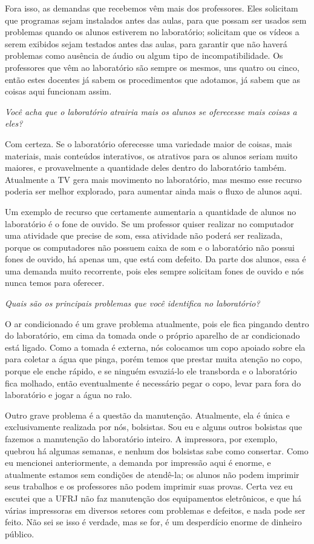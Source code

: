 Fora isso, as demandas que recebemos vêm mais dos professores. Eles solicitam que programas sejam instalados antes das aulas, para que possam ser usados sem problemas quando os alunos estiverem no laboratório; solicitam que os vídeos a serem exibidos sejam testados antes das aulas, para garantir que não haverá problemas como ausência de áudio ou algum tipo de incompatibilidade. Os professores que vêm ao laboratório são sempre os mesmos, uns quatro ou cinco, então estes docentes já sabem os procedimentos que adotamos, já sabem que as coisas aqui funcionam assim.

\textit{Você acha que o laboratório atrairia mais os alunos se oferecesse mais coisas a eles?}

Com certeza. Se o laboratório oferecesse uma variedade maior de coisas, mais materiais, mais conteúdos interativos, os atrativos para os alunos seriam muito maiores, e provavelmente a quantidade deles dentro do laboratório também. Atualmente a TV gera mais movimento no laboratório, mas mesmo esse recurso poderia ser melhor explorado, para aumentar ainda mais o fluxo de alunos aqui.

Um exemplo de recurso que certamente aumentaria a quantidade de alunos no laboratório é o fone de ouvido. Se um professor quiser realizar no computador uma atividade que precise de som, essa atividade não poderá ser realizada, porque os computadores não possuem caixa de som e o laboratório não possui fones de ouvido, há apenas um, que está com defeito. Da parte dos alunos, essa é uma demanda muito recorrente, pois eles sempre solicitam fones de ouvido e nós nunca temos para oferecer.

\textit{Quais são os principais problemas que você identifica no laboratório?}

O ar condicionado é um grave problema atualmente, pois ele fica pingando dentro do laboratório, em cima da tomada onde o próprio aparelho de ar condicionado está ligado. Como a tomada é externa, nós colocamos um copo apoiado sobre ela para coletar a água que pinga, porém temos que prestar muita atenção no copo, porque ele enche rápido, e se ninguém esvaziá-lo ele transborda e o laboratório fica molhado, então eventualmente é necessário pegar o copo, levar para fora do laboratório e jogar a água no ralo.

Outro grave problema é a questão da manutenção. Atualmente, ela é única e exclusivamente realizada por nós, bolsistas. Sou eu e alguns outros bolsistas que fazemos a manutenção do laboratório inteiro. A impressora, por exemplo, quebrou há algumas semanas, e nenhum dos bolsistas sabe como consertar. Como eu mencionei anteriormente, a demanda por impressão aqui é enorme, e atualmente estamos sem condições de atendê-la; os alunos não podem imprimir seus trabalhos e os professores não podem imprimir suas provas. Certa vez eu escutei que a UFRJ não faz manutenção dos equipamentos eletrônicos, e que há várias impressoras em diversos setores com problemas e defeitos, e nada pode ser feito. Não sei se isso é verdade, mas se for, é um desperdício enorme de dinheiro público.

